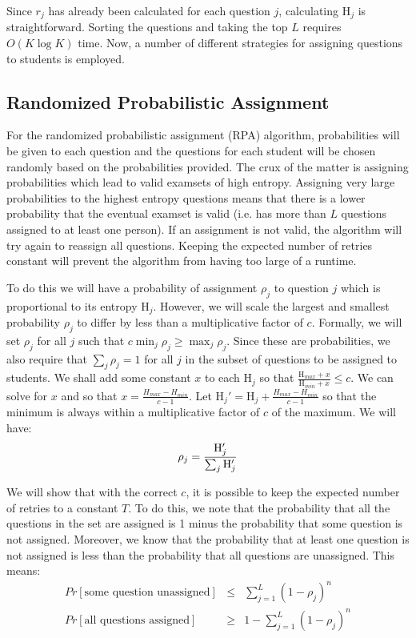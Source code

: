 \documentclass[psamsfonts]{amsart}
\begin{document}
Since $r_j$ has already been calculated for each question $j$, calculating $\mathrm{H}_j$ is straightforward. Sorting the questions and taking the top $L$ requires $O(K \log K)$ time. Now, a number of different strategies for assigning questions to students is employed.

\subsection{Randomized Probabilistic Assignment}

For the randomized probabilistic assignment (RPA) algorithm, probabilities will be given to each question and the questions for each student will be chosen randomly based on the probabilities provided. The crux of the matter is assigning probabilities which lead to valid examsets of high entropy. Assigning very large probabilities to the highest entropy questions means that there is a lower probability that the eventual examset is valid (i.e. has more than $L$ questions assigned to at least one person). If an assignment is not valid, the algorithm will try again to reassign all questions. Keeping the expected number of retries constant will prevent the algorithm from having too large of a runtime. 

To do this we will have a probability of assignment $\rho_j$ to question $j$ which is proportional to its entropy $\mathrm{H}_j$. However, we will scale the largest and smallest probability $\rho_j$ to differ by less than a multiplicative factor of $c$. Formally, we will set $\rho_j$ for all $j$ such that $c \min_j \rho_j \geq \max_j \rho_j$. Since these are probabilities, we also require that $\sum_{j} \rho_j = 1$ for all $j$ in the subset of questions to be assigned to students. We shall add some constant $x$ to each $\mathrm{H}_j$ so that $\frac{\mathrm{H}_{max} + x}{\mathrm{H}_{min} + x} \leq c$. We can solve for $x$ and so that $x = \frac{H_{max} - H_{min}}{c - 1}$. Let $\mathrm{H}_j' = \mathrm{H}_{j} + \frac{H_{max} - H_{min}}{c - 1}$ so that the minimum is always within a multiplicative factor of $c$ of the maximum. We will have:
\begin{eqnarray}
\rho_j = {{\mathrm{H}_j'} \over {\sum_j \mathrm{H}_j'}}
\end{eqnarray}

We will show that with the correct $c$, it is possible to keep the expected number of retries to a constant $T$. To do this, we note that the probability that all the questions in the set are assigned is 1 minus the probability that some question is not assigned. Moreover, we know that the probability that at least one question is not assigned is less than the probability that all questions are unassigned. This means:
\begin{eqnarray}
Pr[\text{some question unassigned}] &\leq& \sum_{j=1}^L (1- \rho_j)^n \\
Pr[\text{all questions assigned}] &\geq& 1 - \sum_{j=1}^L (1 - \rho_j)^n 
\end{eqnarray}
\end{document}
